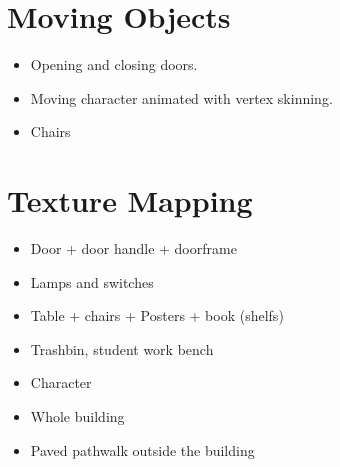 \documentclass[12pt]{article}
\begin{document}
\section{Moving Objects}
\begin{itemize}
\item Opening and closing doors.
\item Moving character animated with vertex skinning.
\item Chairs
\end{itemize}

\section{Texture Mapping}
\begin{itemize}
\item Door + door handle + doorframe
\item Lamps and switches
\item Table + chairs + Posters + book (shelfs)
\item Trashbin, student work bench
\item Character
\item Whole building
\item Paved pathwalk outside the building
\end{itemize}
\end{document}
